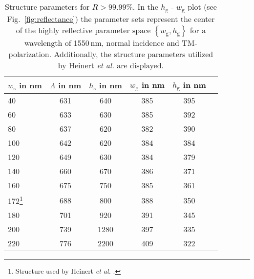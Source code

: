 \documentclass[twocolumn,secnumarabic,amssymb, nobibnotes, aps, prd, showpacs]{revtex4-1}
\begin{document}
\begin{table}[b]
\begin{center}
	\caption{Structure parameters for $R>99.99\%$. In the $h_\mathrm{g}$ - $w_\mathrm{g}$ plot (see Fig.~\ref{fig:reflectance}) the parameter sets represent the center of the highly reflective parameter space $\left\{w_\mathrm{g},h_\mathrm{g}\right\}$ for a wavelength of 1550\,nm, normal incidence and TM-polarization. Additionally, the structure parameters utilized by Heinert \textit{et al.} \cite{Hei2013} are displayed.}\vspace{0.5cm}
  \begin{tabular*}{\columnwidth}{l@{\extracolsep\fill}ccccc}
		\hline\hline
    $w_\mathrm{s}$ in nm & $\Lambda$ in nm & $h_\mathrm{s}$ in nm & $w_\mathrm{g}$ in nm & $h_\mathrm{g}$ in nm\\ \hline
    40 & 631 & 640 & 385 & 395 \\
		60 & 633 & 630 & 385 & 392 \\
		80 & 637 & 620 & 382 & 390 \\
		100 & 642 & 620 & 384 & 384 \\
		120 & 649 & 630 & 384 & 379 \\
		140 & 660 & 670 & 386 & 371 \\
		160 & 675 & 750 & 385 & 361 \\
		172\footnote{Structure used by Heinert \textit{et al.} \cite{Hei2013}.} & 688 & 800 & 388 &350\\
		180 & 701 & 920 & 391 & 345 \\
		200 & 739 & 1280 & 397 & 335 \\
    220 & 776 & 2200 & 409 & 322 \\  \hline
  \end{tabular*}
	\label{tab:Parameters}
\end{center}
\end{table}
\end{document}
